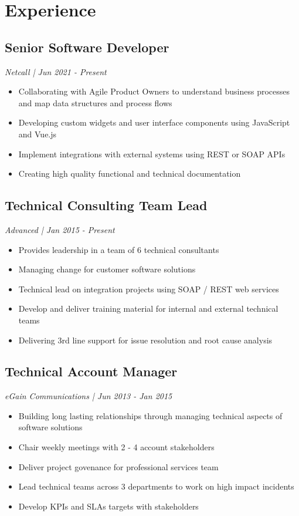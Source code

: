 %
%
\section{Experience}
%
%
\subsection{Senior Software Developer}
\textit{ Netcall | Jun 2021 - Present }
\begin{itemize}
\vspace{6pt}
	\item Collaborating with Agile Product Owners to understand business processes and map data structures and process flows
	\item Developing custom widgets and user interface components using JavaScript and Vue.js
	\item Implement integrations with external systems using REST or SOAP APIs
	\item Creating high quality functional and technical documentation
\end{itemize}

%
%
\subsection{Technical Consulting Team Lead}
\textit{ Advanced | Jan 2015 - Present }
\begin{itemize}
\vspace{6pt}
	\item Provides leadership in a team of 6 technical consultants
	\item Managing change for customer software solutions
	\item Technical lead on integration projects using SOAP / REST web services
	\item Develop and deliver training material for internal and external technical teams
	\item Delivering 3rd line support for issue resolution and root cause analysis
\end{itemize}

%
%
\subsection{Technical Account Manager}
\textit{ eGain Communications | Jun 2013 - Jan 2015 }
\begin{itemize}
	\item Building long lasting relationships through managing technical aspects of software solutions
	\item Chair weekly meetings with 2 - 4 account stakeholders
	\item Deliver project govenance for professional services team
	\item Lead technical teams across 3 departments to work on high impact incidents
	\item Develop KPIs and SLAs targets with stakeholders
\end{itemize}

